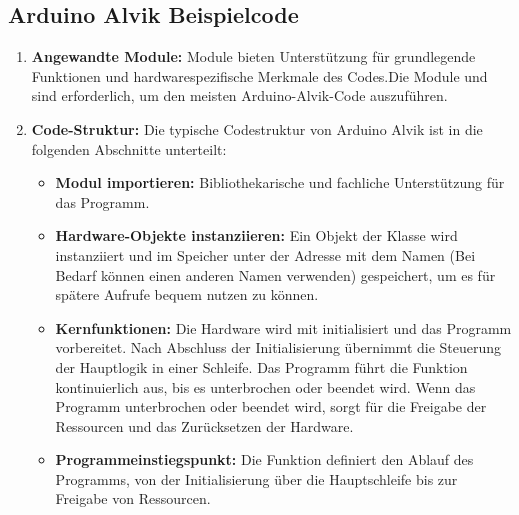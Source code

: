 \subsection{Arduino Alvik Beispielcode}
\begin{enumerate}
	\item \textbf{Angewandte Module:} Module bieten Unterstützung für grundlegende Funktionen und hardwarespezifische Merkmale des Codes.Die Module  und  sind erforderlich, um den meisten Arduino-Alvik-Code auszuführen.
	
	\item \textbf{Code-Struktur:} Die typische Codestruktur von Arduino Alvik ist in die folgenden Abschnitte unterteilt:
	\begin{itemize}
		\item \textbf{Modul importieren:} Bibliothekarische und fachliche Unterstützung für das Programm.
		\item \textbf{Hardware-Objekte instanziieren:} Ein Objekt der Klasse  wird instanziiert und im Speicher unter der Adresse mit dem Namen (Bei Bedarf können einen anderen Namen verwenden) gespeichert, um es für spätere Aufrufe bequem nutzen zu können.
		\item \textbf{Kernfunktionen:} Die Hardware wird mit  initialisiert und das Programm vorbereitet. Nach Abschluss der Initialisierung übernimmt  die Steuerung der Hauptlogik in einer Schleife. Das Programm führt die Funktion  kontinuierlich aus, bis es unterbrochen oder beendet wird. Wenn das Programm unterbrochen oder beendet wird, sorgt  für die Freigabe der Ressourcen und das Zurücksetzen der Hardware.
		\item \textbf{Programmeinstiegspunkt:} Die Funktion  definiert den Ablauf des Programms, von der Initialisierung über die Hauptschleife bis zur Freigabe von Ressourcen. \cite{Maik:2021}
	\end{itemize}
	

\end{enumerate}
